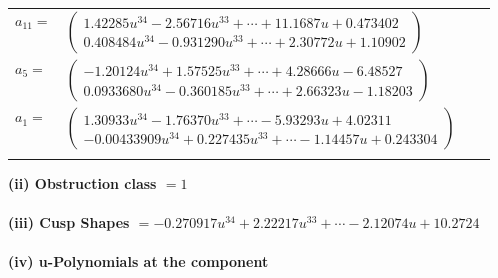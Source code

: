 \documentclass[1p]{elsarticle_modified}
\theoremstyle{definition}
\begin{document}
\begin{tabular}{m{7pt} m{180pt} m{7pt} m{180pt} }
\flushright $a_{11}=$&$\begin{pmatrix}1.42285 u^{34}-2.56716 u^{33}+\cdots+11.1687 u+0.473402\\0.408484 u^{34}-0.931290 u^{33}+\cdots+2.30772 u+1.10902\end{pmatrix}$ \\
\flushright $a_{5}=$&$\begin{pmatrix}-1.20124 u^{34}+1.57525 u^{33}+\cdots+4.28666 u-6.48527\\0.0933680 u^{34}-0.360185 u^{33}+\cdots+2.66323 u-1.18203\end{pmatrix}$ \\
\flushright $a_{1}=$&$\begin{pmatrix}1.30933 u^{34}-1.76370 u^{33}+\cdots-5.93293 u+4.02311\\-0.00433909 u^{34}+0.227435 u^{33}+\cdots-1.14457 u+0.243304\end{pmatrix}$\\&\end{tabular}
\flushleft \textbf{(ii) Obstruction class $= 1$}\\~\\
\flushleft \textbf{(iii) Cusp Shapes $= -0.270917 u^{34}+2.22217 u^{33}+\cdots-2.12074 u+10.2724$}\\~\\
\newpage\renewcommand{\arraystretch}{1}
\flushleft \textbf{(iv) u-Polynomials at the component}\newline \\
\end{document}
